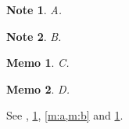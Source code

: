 \documentclass{article}
\newtheorem{note}{Note}
\newtheorem{memo}{Memo}
\begin{document}
\begin{note}\label{n:a}A.\end{note}
\begin{note}\label{n:b}B.\end{note}
\begin{memo}\label{m:a}C.\end{memo}
\begin{memo}\label{m:b}D.\end{memo}
See , \cref{n:a}, \cref{m:a,m:b} and \cref{m:a}.
\end{document}
